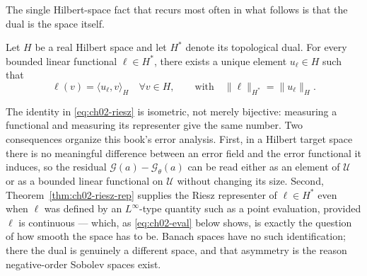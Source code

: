 The single Hilbert-space fact that recurs most often in what follows is that the dual is the space itself.

\begin{theorem}
\label{thm:ch02-riesz-rep}
Let $H$ be a real Hilbert space and let $H^*$ denote its topological dual. For every bounded linear functional $\ell \in H^*$, there exists a unique element $u_\ell \in H$ such that
\begin{equation}
  \ell(v) = \langle u_\ell, v \rangle_H \quad \forall v \in H, \qquad \text{with} \quad \|\ell\|_{H^*} = \|u_\ell\|_H.
  \label{eq:ch02-riesz}
\end{equation}
\end{theorem}

The identity in \eqref{eq:ch02-riesz} is isometric, not merely bijective: measuring a functional and measuring its representer give the same number. Two consequences organize this book's error analysis. First, in a Hilbert target space there is no meaningful difference between an error field and the error functional it induces, so the residual $\mathcal{G}(a) - \mathcal{G}_\theta(a)$ can be read either as an element of $\mathcal{U}$ or as a bounded linear functional on $\mathcal{U}$ without changing its size. Second, Theorem~\ref{thm:ch02-riesz-rep} supplies the Riesz representer of $\ell \in H^*$ even when $\ell$ was defined by an $L^\infty$-type quantity such as a point evaluation, provided $\ell$ is continuous --- which, as \eqref{eq:ch02-eval} below shows, is exactly the question of how smooth the space has to be. Banach spaces have no such identification; there the dual is genuinely a different space, and that asymmetry is the reason negative-order Sobolev spaces exist.

